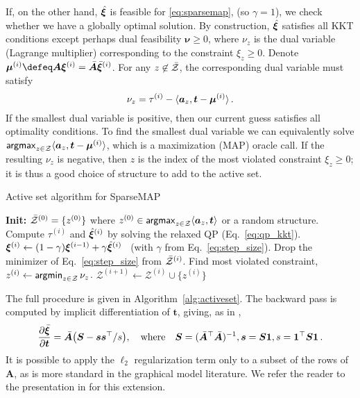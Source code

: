 If, on the other hand, $\hat{\bm{\xi}}$ is feasible for \eqref{eq:sparsemap},
(so $\gamma=1$),
we check whether we have a globally optimal solution.
By construction, $\hat{\bm{\xi}}$ satisfies all KKT
conditions except perhaps dual feasibility $\bm{\nu} \geq 0$,
where $\nu_z$ is the dual variable (Lagrange multiplier) corresponding to the
constraint $\xi_z \geq 0$.
Denote $\bm{\mu}^{(i)} \defeq \bm{A}\pv^{(i)} = \bar{\bm{A}}\bar{\pv}^{(i)}$.
For any $z \not\in \bar{\mathcal{Z}}$, the corresponding dual variable must satisfy
%
\begin{equation}\label{eq:dual}
    \nu_z = \tau^{(i)} - \langle\bm{a}_z,\bm{t} - \bm{\mu}^{(i)}\rangle\,.
\end{equation}
%
If the smallest dual variable is positive, then our current guess satisfies all
optimality conditions. To find the smallest dual variable we can equivalently
solve $\operatorname*{\mathsf{argmax}}_{z \in \mathcal{Z}} \langle\bm{a}_z,\bm{t} - \bm{\mu}^{(i)}\rangle$, which is
a maximization (MAP) oracle call. If the resulting $\nu_z$ is negative,
then $z$ is the index of the most violated constraint $\xi_z \geq 0$;
it is thus a good choice of structure to add to the active set.

\begin{algorithm}[htpb]
    \caption{Active set algorithm for SparseMAP \label{alg:activeset}}
    \begin{algorithmic}[1]
        \Statex \textbf{Init:}
        $\bar{\mathcal{Z}}^{(0)} = \{ z^{(0)}\}$
        \quad where \quad
        $z^{(0)} \in \operatorname*{\mathsf{argmax}}_{z \in \mathcal{Z}} \langle\bm{a}_z,\bm{t}\rangle$
        or a random structure.
        \State Compute $\tau^{(i)}$ and $\hat{\bm{\xi}}^{(i)}$ by solving the relaxed QP (Eq.~\ref{eq:qp_kkt}).
        \State $\bm{\xi}^{(i)} \gets (1-\gamma) \bm{\xi}^{(i-1)} + \gamma \hat{\bm{\xi}}^{(i)}$
        ~(with $\gamma$ from Eq.~\ref{eq:step_size}).
        \State Drop the minimizer of Eq.~\ref{eq:step_size} from $\bar{\mathcal{Z}}^{(i)}$.
        \Else
        \State Find most violated constraint,
        $z^{(i)} \gets \operatorname*{\mathsf{argmin}}_{z \in \mathcal{Z}} \nu_z$.
        \State \Return {}
        \Else
        \State $\mathcal{Z}^{(i+1)} \gets \mathcal{Z}^{(i)} \cup \{ z^{(i)} \}$
        \EndIf
        \EndIf
        \EndFor
    \end{algorithmic}
\end{algorithm}

The full procedure is given in Algorithm~\ref{alg:activeset}.
The backward pass is computed by implicit differentiation of  \wrt
$\bm{t}$, giving, as in \cite{sparsemap},
\begin{equation}
    \frac{\partial \bar{\bm{\xi}}}{\partial \bm{t}} = \bar{\bm{A}}\big(\bm{S} - \bm{ss}^\top / s\big),
    \quad\text{where}\quad
    \bm{S} = (\bar{\bm{A}}^\top \bar{\bm{A}})^{-1},
    \bm{s} = \bm{S1}, s = \bm{1}^\top\bm{S1}
    \,.
\end{equation}
It is possible to apply the $\ell_2$ regularization term only to a subset of the
rows of $\bm{A}$, as is more standard in the graphical model literature. We
refer the reader to the presentation in \cite{ad3,sparsemap} for this extension.
